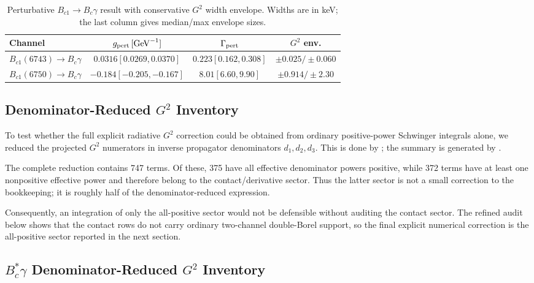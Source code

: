 \documentclass[11pt]{article}
\newcommand{\Bcst}{B_c^\ast}
\newcommand{\GeV}{\mathrm{GeV}}
\begin{document}
\begin{table}[h]
\centering
\caption{Perturbative \(B_{c1}\to B_c\gamma\) result with conservative
\(G^2\) width envelope.  Widths are in keV; the last column gives
median/max envelope sizes.}
\small
\begin{tabular}{lccc}
\hline
Channel & \(g_{\rm pert}\,[\GeV^{-1}]\) & \(\Gamma_{\rm pert}\) &
\(G^2\) env.\\
\hline
\(B_{c1}(6743)\to B_c\gamma\) &
\(0.0316[0.0269,0.0370]\) &
\(0.223[0.162,0.308]\) &
\(\pm0.025/\pm0.060\)\\
\(B_{c1}(6750)\to B_c\gamma\) &
\(-0.184[-0.205,-0.167]\) &
\(8.01[6.60,9.90]\) &
\(\pm0.914/\pm2.30\)\\
\hline
\end{tabular}
\label{tab:bc-g2-envelope}
\end{table}

\subsection*{Denominator-Reduced \(G^2\) Inventory}

To test whether the full explicit radiative \(G^2\) correction could be
obtained from ordinary positive-power Schwinger integrals alone, we reduced
the projected \(G^2\) numerators in inverse propagator denominators
\(d_1,d_2,d_3\).  This is done by
; the summary is generated by
.

The complete reduction contains 747 terms.  Of these, 375 have all effective
denominator powers positive, while 372 terms have at least one nonpositive
effective power and therefore belong to the contact/derivative sector.  Thus
the latter sector is not a small correction to the bookkeeping; it is roughly
half of the denominator-reduced expression.

Consequently, an integration of only the all-positive sector would not be
defensible without auditing the contact sector.  The refined audit below shows
that the contact rows do not carry ordinary two-channel double-Borel support,
so the final explicit numerical correction is the all-positive sector reported
in the next section.

\subsection*{\texorpdfstring{\(\Bcst\gamma\)}{Bcstar gamma}
Denominator-Reduced \(G^2\) Inventory}
\end{document}
